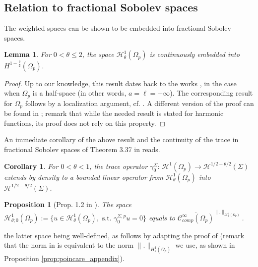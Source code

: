 \documentclass[report]{elsarticle}
\newtheorem{proposition}[theorem]{Proposition}
\newtheorem{corollary}[theorem]{Corollary}
\newtheorem{lemma}[theorem]{Lemma}
\numberwithin{theorem}{section}
\newcommand{\re}{\varepsilon}
\begin{document}
\subsection{Relation to fractional Sobolev spaces}The weighted spaces can be shown to be embedded into fractional Sobolev spaces.
\begin{lemma}
	\label{lem:embedding}
	For $0<\theta\leq2$, the space $\mathcal{H}^1_{ \theta}(\Omega_p)$ is continuously embedded into  ${H}^{1-\frac{\theta}{2}}(\Omega_p)$.
\end{lemma}
\begin{proof}
	Up to our knowledge, this result dates back to the works \cite{lizorkin, uspenskii}, in the case when $\Omega_p$ is a half-space (in other words, $a=\ell=+\infty$). The corresponding result for $\Omega_p$ follows by a localization argument, cf. \cite[Theorem 3.20]{mclean}. A different version of the proof can be found in \cite[Theorems 4.1, 4.2]{jerison_kenig};  remark that while the needed result is stated for harmonic functions, its proof does not rely on this property.
\end{proof}
	
An immediate corollary of the above result and the  continuity of the trace in fractional Sobolev spaces of Theorem 3.37 in \cite{mclean} reads.
\begin{corollary}
	\label{cor:tr}
	For $0<\theta<1$, the trace operator $\gamma_0^{\Sigma}: \, \mathcal{H}^1(\Omega_p)\rightarrow \mathcal{H}^{1/2-\theta/2}(\Sigma)$ extends by density to a bounded linear operator from $\mathcal{H}^1_{\theta}(\Omega_p)$ into $\mathcal{H}^{1/2-\theta/2}(\Sigma)$.
\end{corollary}
\begin{proposition}[Prop. 1.2 in \cite{grisvard}]
	\label{prop:gamma0}
	The space $\mathcal{H}^1_{\theta;0}(\Omega_p):=\{u\in \mathcal{H}^1_{\theta}(\Omega_p), \text{ s.t. }\gamma_0^{\Sigma,p}u=0\}$ equals to $\overline{\mathcal{C}^{\infty}_{comp}(\Omega_p)}^{\|.\|_{\mathcal{H}^1_{\theta}(\Omega_p)}}$.
\end{proposition}
the latter space being well-defined, as follows by adapting the proof of \cite[Proposition 1.1']{grisvard} (remark that the norm in \cite{grisvard} is equivalent to the norm $\|.\|_{H^1_{\re}(\Omega_p)}$ we use, as shown in Proposition \ref{prop:poincare_appendix}).
\end{document}
